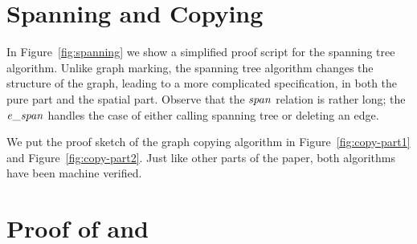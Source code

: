 
\appendix

\section{Spanning and Copying}
\label{apx:spanning}



In Figure~\ref{fig:spanning} we show a simplified proof script for
the spanning tree algorithm.  Unlike graph marking, the spanning tree algorithm changes the
structure of the graph, leading to a more complicated specification,
in both the pure part and the spatial part. Observe that the $\mathit{span}$ relation is
rather long; the $\mathit{e\_span}$ handles the case of either calling spanning tree or deleting an edge.

We put the proof sketch of the graph copying algorithm in
Figure~\ref{fig:copy-part1} and Figure~\ref{fig:copy-part2}. Just like
other parts of the paper, both algorithms have been machine verified.




\section{Proof of  and }
\label{apx:ruleproofs}

